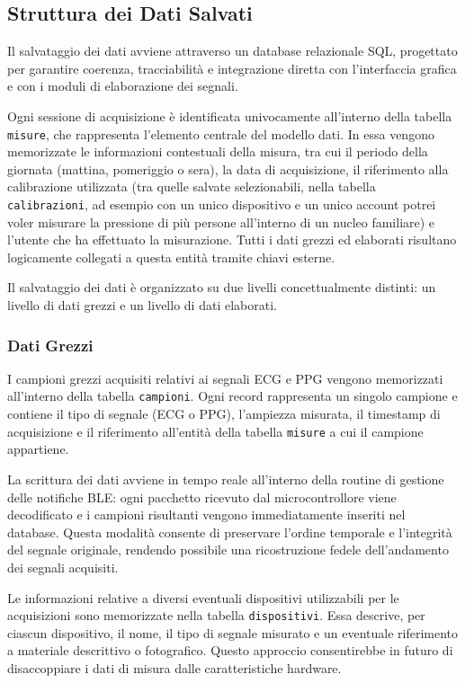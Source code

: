 \documentclass[11pt,a4paper]{article}
\begin{document}
\subsection{Struttura dei Dati Salvati}
Il salvataggio dei dati avviene attraverso un database relazionale SQL, progettato per garantire coerenza, tracciabilità e integrazione diretta con l’interfaccia grafica e con i moduli di elaborazione dei segnali.

Ogni sessione di acquisizione è identificata univocamente all’interno della tabella \texttt{misure}, che rappresenta l’elemento centrale del modello dati. In essa vengono memorizzate le informazioni contestuali della misura, tra cui il periodo della giornata (mattina, pomeriggio o sera), la data di acquisizione, il riferimento alla calibrazione utilizzata (tra quelle salvate selezionabili, nella tabella \texttt{calibrazioni}, ad esempio con un unico dispositivo e un unico account potrei voler misurare la pressione di più persone all'interno di un nucleo familiare) e l’utente che ha effettuato la misurazione. Tutti i dati grezzi ed elaborati risultano logicamente collegati a questa entità tramite chiavi esterne.

Il salvataggio dei dati è organizzato su due livelli concettualmente distinti: un livello di dati grezzi e un livello di dati elaborati.

\subsubsection{Dati Grezzi}
I campioni grezzi acquisiti relativi ai segnali ECG e PPG vengono memorizzati all’interno della tabella \texttt{campioni}. Ogni record rappresenta un singolo campione e contiene il tipo di segnale (ECG o PPG), l’ampiezza misurata, il timestamp di acquisizione e il riferimento all'entità della tabella \texttt{misure} a cui il campione appartiene.

La scrittura dei dati avviene in tempo reale all’interno della routine di gestione delle notifiche BLE: ogni pacchetto ricevuto dal microcontrollore viene decodificato e i campioni risultanti vengono immediatamente inseriti nel database. Questa modalità consente di preservare l’ordine temporale e l’integrità del segnale originale, rendendo possibile una ricostruzione fedele dell’andamento dei segnali acquisiti.

Le informazioni relative a diversi eventuali dispositivi utilizzabili per le acquisizioni sono memorizzate nella tabella \texttt{dispositivi}. Essa descrive, per ciascun dispositivo, il nome, il tipo di segnale misurato e un eventuale riferimento a materiale descrittivo o fotografico. Questo approccio consentirebbe in futuro di disaccoppiare i dati di misura dalle caratteristiche hardware.
\end{document}
